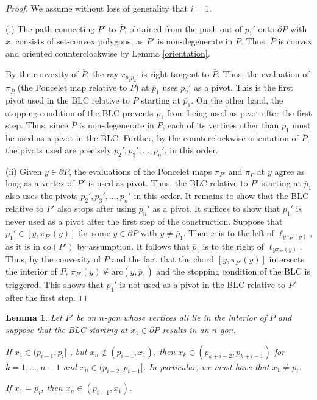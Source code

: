 \documentclass[11pt]{amsart}
\newtheorem{lemma}[theorem]{Lemma}
\theoremstyle{remark}
\numberwithin{equation}{section}
\newcommand{\co}{\mathrm{co}}
\newcommand{\arc}{\mathrm{arc}}
\begin{document}
\begin{proof}
We assume without loss of generality that $i=1$.

(i) The path connecting $P'$ to $\overline P$, obtained from the push-out of $p_1'$ onto $\partial P$ with $x$, consists of set-convex polygons, as $P'$ is non-degenerate in $P$. Thus,  $\overline P$ is convex and  oriented counterclockwise by Lemma \ref{orientation}. 

By the convexity of $\overline P$, the ray $r_{\overline p_1 p_2'}$ is right tangent  to $\overline P$. Thus, the evaluation of $\pi_{\overline P}$ (the Poncelet map relative to $\overline P$) at $\overline p_1$ uses $p_2'$ as a pivot. This is the first pivot used in the BLC relative to $\overline P$ starting at $\overline p_1$. On the other hand, the stopping condition of the BLC prevents $\overline p_1$ from being used as pivot after the first step.  Thus, since $\overline P$ is non-degenerate in $P$, each of its vertices other than $\overline p_1$ must be used as a pivot in the BLC.  Further, by the counterclockwise orientation of $\overline P$,  the pivots  used are precisely $p_2',p_3',\ldots,p_n'$, in this order.  


(ii) Given $y\in \partial P$, the evaluations of the Poncelet maps $\pi_{P'}$ and $\pi_{\overline P}$ at $y$ agree as long as a vertex of $P'$ is used as pivot. Thus, the BLC relative to $P'$ starting at $\overline p_1$ also uses the pivots $p_2',p_3',\ldots,p_n'$ in this order. It remains to  show that the BLC relative to $P'$ also stops  after using $p_n'$ as a pivot. It suffices to show  that $p_1'$ is never used as a pivot after the first step of the construction. Suppose that $p_1'\in [y,\pi_{P'}(y)]$ for some $y\in \partial P$ with $y\neq \overline p_1$. Then $x$ is to the left of $\ell_{y\pi_{P'}(y)}$, as it is in $\co(P')$ by assumption. It follows that $\overline p_1$ is to the right of $\ell_{y\pi_{P'}(y)}$. Thus, by the convexity of $P$ and the fact that the chord $[y,\pi_{P'}(y)]$ intersects the interior of $P$,  $\pi_{P'}(y)\notin \arc(y,\overline p_1)$ and the stopping condition of the BLC is triggered. This shows that $p_1'$ is not used as a pivot in the BLC relative to $P'$ after the first step.
\end{proof}



\begin{lemma}\label{lastwallpockets}
Let $P'$ be an $n$-gon  whose vertices all lie in the interior of $P$ and suppose that the BLC starting at $x_1\in \partial P$ results in an $n$-gon.

If $x_1\in  (p_{i-1},p_{i}]$ , but $x_n\notin  (p_{i-1},x_1)$, then
 $x_k\in (p_{k+i-2},p_{k+i-1})$ for $k=1, \ldots, n-1$ and
$x_n\in (p_{i-2},p_{i-1}]$. In particular, we must have that $x_1\neq p_i$.

If $x_1=p_i$, then $x_n\in (p_{i-1},x_1)$.
\end{lemma}
\end{document}
